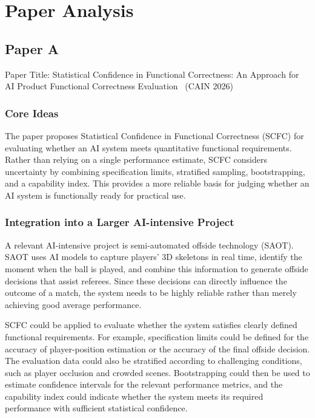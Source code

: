 \section{Paper Analysis}

\subsection{Paper A}

    Paper Title: Statistical Confidence in Functional Correctness: An Approach for AI Product Functional Correctness Evaluation~\cite{AlbertiniEtAl2026SCFC} (CAIN 2026)

    \subsubsection{Core Ideas}

    The paper proposes Statistical Confidence in Functional Correctness (SCFC) for evaluating whether an AI system meets quantitative functional requirements. Rather than relying on a single performance estimate, SCFC considers uncertainty by combining specification limits, stratified sampling, bootstrapping, and a capability index. This provides a more reliable basis for judging whether an AI system is functionally ready for practical use.


    \subsubsection{Integration into a Larger AI-intensive Project}

    A relevant AI-intensive project is semi-automated offside technology (SAOT). SAOT uses AI models to capture players' 3D skeletons in real time, identify the moment when the ball is played, and combine this information to generate offside decisions that assist referees. Since these decisions can directly influence the outcome of a match, the system needs to be highly reliable rather than merely achieving good average performance.
    
    SCFC could be applied to evaluate whether the system satisfies clearly defined functional requirements. For example, specification limits could be defined for the accuracy of player-position estimation or the accuracy of the final offside decision. The evaluation data could also be stratified according to challenging conditions, such as player occlusion and crowded scenes. Bootstrapping could then be used to estimate confidence intervals for the relevant performance metrics, and the capability index could indicate whether the system meets its required performance with sufficient statistical confidence.
    
